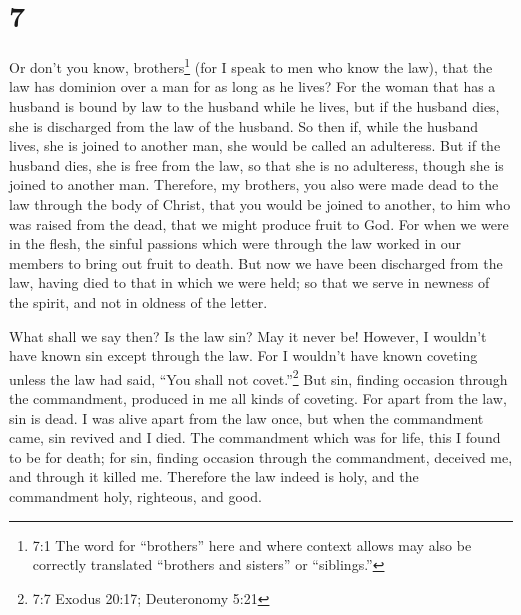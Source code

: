 \hypertarget{section-6}{%
\section{7}\label{section-6}}

 Or don't you know, brothers\footnote{7:1 The word for
  ``brothers'' here and where context allows may also be correctly
  translated ``brothers and sisters'' or ``siblings.''} (for I speak to
men who know the law), that the law has dominion over a man for as long
as he lives?  For the woman that has a husband is bound by
law to the husband while he lives, but if the husband dies, she is
discharged from the law of the husband.  So then if, while
the husband lives, she is joined to another man, she would be called an
adulteress. But if the husband dies, she is free from the law, so that
she is no adulteress, though she is joined to another man. 
Therefore, my brothers, you also were made dead to the law through the
body of Christ, that you would be joined to another, to him who was
raised from the dead, that we might produce fruit to God. 
For when we were in the flesh, the sinful passions which were through
the law worked in our members to bring out fruit to death. 
But now we have been discharged from the law, having died to that in
which we were held; so that we serve in newness of the spirit, and not
in oldness of the letter.

 What shall we say then? Is the law sin? May it never be!
However, I wouldn't have known sin except through the law. For I
wouldn't have known coveting unless the law had said, ``You shall not
covet.''\footnote{7:7 Exodus 20:17; Deuteronomy 5:21}  But
sin, finding occasion through the commandment, produced in me all kinds
of coveting. For apart from the law, sin is dead.  I was
alive apart from the law once, but when the commandment came, sin
revived and I died.  The commandment which was for life,
this I found to be for death;  for sin, finding occasion
through the commandment, deceived me, and through it killed me.
 Therefore the law indeed is holy, and the commandment
holy, righteous, and good.

